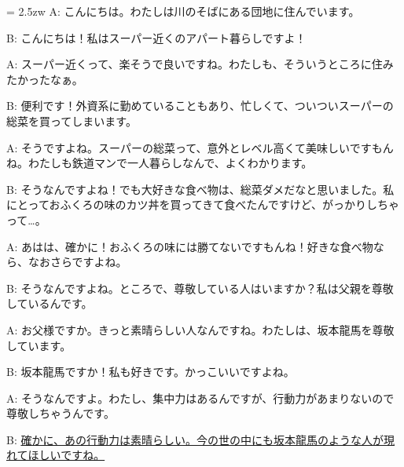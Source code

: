 \documentclass[11pt]{amsart}
\title{}
\author{}
\newenvironment{hangall}[1]{\hangindent = 2.5zw\everypar{\hangindent = 2.5zw}}{}
\begin{document}
\maketitle
\begin{hangall}{}%
A: こんにちは。わたしは川のそばにある団地に住んでいます。

B: こんにちは！私はスーパー近くのアパート暮らしですよ！

A: スーパー近くって、楽そうで良いですね。わたしも、そういうところに住みたかったなぁ。

B: 便利です！外資系に勤めていることもあり、忙しくて、ついついスーパーの総菜を買ってしまいます。

A: そうですよね。スーパーの総菜って、意外とレベル高くて美味しいですもんね。わたしも鉄道マンで一人暮らしなんで、よくわかります。

B: そうなんですよね！でも大好きな食べ物は、総菜ダメだなと思いました。私にとっておふくろの味のカツ丼を買ってきて食べたんですけど、がっかりしちゃって…。

A: あはは、確かに！おふくろの味には勝てないですもんね！好きな食べ物なら、なおさらですよね。

B: そうなんですよね。ところで、尊敬している人はいますか？私は父親を尊敬しているんです。

A: お父様ですか。きっと素晴らしい人なんですね。わたしは、坂本龍馬を尊敬しています。

B: 坂本龍馬ですか！私も好きです。かっこいいですよね。

A: そうなんですよ。わたし、集中力はあるんですが、行動力があまりないので尊敬しちゃうんです。

B: \ul{確かに、あの行動力は素晴らしい。今の世の中にも坂本龍馬のような人が現れてほしいですね。}\end{hangall}
\end{document}
